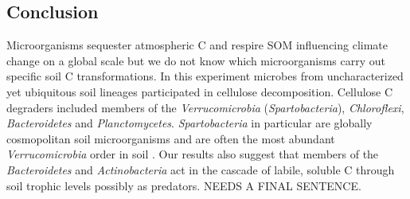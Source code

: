 \subsection{Conclusion} 
Microorganisms sequester atmospheric C and respire SOM influencing climate
change on a global scale but we do not know which microorganisms carry out
specific soil C transformations. In this experiment microbes from
uncharacterized yet ubiquitous soil lineages participated in cellulose
decomposition. Cellulose C degraders included members of the
\textit{Verrucomicrobia} (\textit{Spartobacteria}),
\textit{Chloroflexi}, \textit{Bacteroidetes} and \textit{Planctomycetes}.
\textit{Spartobacteria} in particular are globally cosmopolitan soil
microorganisms and are often the most abundant \textit{Verrucomicrobia}
order in soil \citep{Bergmann_2011}. Our results also suggest that
members of the \textit{Bacteroidetes} and \textit{Actinobacteria} act in
the cascade of labile, soluble C through soil trophic levels possibly as
predators. NEEDS A FINAL SENTENCE.
